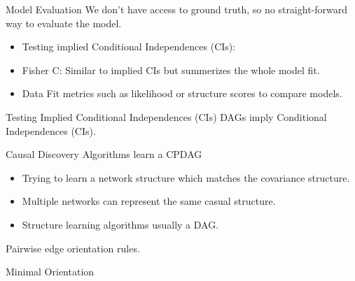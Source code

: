 \documentclass{beamer}
\begin{document}
\begin{frame}{Model Evaluation}
	We don't have access to ground truth, so no straight-forward way to evaluate the model.

	\begin{itemize}
		\item Testing implied Conditional Independences (CIs): 
		\item Fisher C: Similar to implied CIs but summerizes the whole model fit.
		\item Data Fit metrics such as likelihood or structure scores to compare models.
	\end{itemize}
\end{frame}

\begin{frame}{Testing Implied Conditional Independences (CIs)}
	DAGs imply Conditional Independences (CIs).
\end{frame}

\begin{frame}{Causal Discovery Algorithms learn a CPDAG}
	\begin{figure}
	\end{figure}
	
	\begin{itemize}
		\item Trying to learn a network structure which matches the covariance
			structure.
		\item Multiple networks can represent the same casual structure.
		\item Structure learning algorithms usually a DAG.
	\end{itemize}

	Pairwise edge orientation rules.
\end{frame}

\begin{frame}{Minimal Orientation}
\end{frame}
\end{document}
